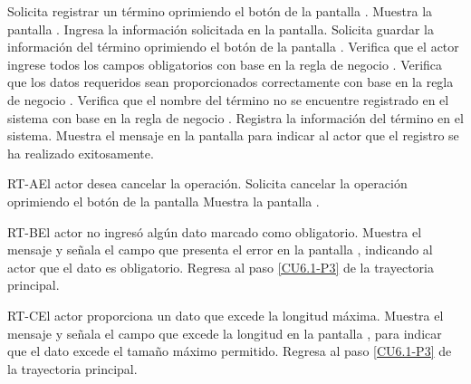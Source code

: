 	\begin{UCtrayectoria}
		\UCpaso[\UCactor] Solicita registrar un término oprimiendo el botón  de la pantalla .
		\UCpaso[\UCsist] Muestra la pantalla .
		\UCpaso[\UCactor] Ingresa la información solicitada en la pantalla. \label{CU6.1-P3}
		\UCpaso[\UCactor] Solicita guardar la información del término oprimiendo el botón  de la pantalla . 
		\UCpaso[\UCsist] Verifica que el actor ingrese todos los campos obligatorios con base en la regla de negocio . 
		\UCpaso[\UCsist] Verifica que los datos requeridos sean proporcionados correctamente con base en la regla de negocio .  
		\UCpaso[\UCsist] Verifica que el nombre del término no se encuentre registrado en el sistema con base en la regla de negocio . 
		\UCpaso[\UCsist] Registra la información del término en el sistema.
		\UCpaso[\UCsist] Muestra el mensaje  en la pantalla  para indicar al actor que el registro se ha realizado exitosamente.
	\end{UCtrayectoria}		
	
	\begin{UCtrayectoriaA}{RT-A}{El actor desea cancelar la operación.}
		\UCpaso[\UCactor] Solicita cancelar la operación oprimiendo el botón  de la pantalla 
		\UCpaso[\UCsist] Muestra la pantalla .
	\end{UCtrayectoriaA}

	\begin{UCtrayectoriaA}{RT-B}{El actor no ingresó algún dato marcado como obligatorio.}
		\UCpaso[\UCsist] Muestra el mensaje  y señala el campo que presenta el error en la pantalla , indicando al actor que el dato es obligatorio.
		\UCpaso Regresa al paso \ref{CU6.1-P3} de la trayectoria principal.
	\end{UCtrayectoriaA}

	\begin{UCtrayectoriaA}{RT-C}{El actor proporciona un dato que excede la longitud máxima.}
		\UCpaso[\UCsist] Muestra el mensaje  y señala el campo que excede la longitud en la pantalla , para indicar que el dato excede el tamaño máximo permitido.
		\UCpaso Regresa al paso \ref{CU6.1-P3} de la trayectoria principal.
	\end{UCtrayectoriaA}

